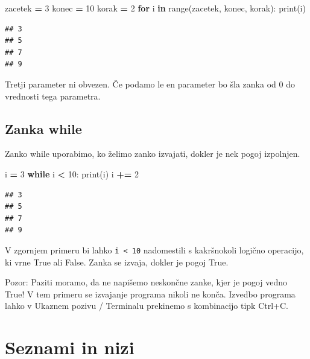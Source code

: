 \documentclass[
]{report}
\newenvironment{Shaded}{\begin{snugshade}}{\end{snugshade}}
\newcommand{\BuiltInTok}[1]{#1}
\newcommand{\ControlFlowTok}[1]{\textcolor[rgb]{0.13,0.29,0.53}{\textbf{#1}}}
\newcommand{\DecValTok}[1]{\textcolor[rgb]{0.00,0.00,0.81}{#1}}
\newcommand{\KeywordTok}[1]{\textcolor[rgb]{0.13,0.29,0.53}{\textbf{#1}}}
\newcommand{\NormalTok}[1]{#1}
\newcommand{\OperatorTok}[1]{\textcolor[rgb]{0.81,0.36,0.00}{\textbf{#1}}}
\begin{document}
\begin{Shaded}
\begin{Highlighting}[]
\NormalTok{zacetek }\OperatorTok{=} \DecValTok{3}
\NormalTok{konec }\OperatorTok{=} \DecValTok{10}
\NormalTok{korak }\OperatorTok{=} \DecValTok{2}
\ControlFlowTok{for}\NormalTok{ i }\KeywordTok{in} \BuiltInTok{range}\NormalTok{(zacetek, konec, korak):}
    \BuiltInTok{print}\NormalTok{(i)}
\end{Highlighting}
\end{Shaded}

\begin{verbatim}
## 3
## 5
## 7
## 9
\end{verbatim}

Tretji parameter ni obvezen. Če podamo le en parameter bo šla zanka od 0 do
vrednosti tega parametra.

\hypertarget{zanka-while}{%
\section{Zanka while}\label{zanka-while}}

Zanko while uporabimo, ko želimo zanko izvajati, dokler je nek pogoj izpolnjen.

\begin{Shaded}
\begin{Highlighting}[]
\NormalTok{i }\OperatorTok{=} \DecValTok{3}
\ControlFlowTok{while}\NormalTok{ i }\OperatorTok{\textless{}} \DecValTok{10}\NormalTok{:}
    \BuiltInTok{print}\NormalTok{(i)}
\NormalTok{    i }\OperatorTok{+=} \DecValTok{2}
\end{Highlighting}
\end{Shaded}

\begin{verbatim}
## 3
## 5
## 7
## 9
\end{verbatim}

V zgornjem primeru bi lahko \texttt{i\ \textless{}\ 10} nadomestili s kakršnokoli logično operacijo,
ki vrne True ali False. Zanka se izvaja, dokler je pogoj True.

Pozor: Paziti moramo, da ne napišemo neskončne zanke, kjer je pogoj vedno True!
V tem primeru se izvajanje programa nikoli ne konča. Izvedbo programa lahko v
Ukaznem pozivu / Terminalu prekinemo s kombinacijo tipk Ctrl+C.

\hypertarget{seznami-in-nizi}{%
\chapter{Seznami in nizi}\label{seznami-in-nizi}}
\end{document}
